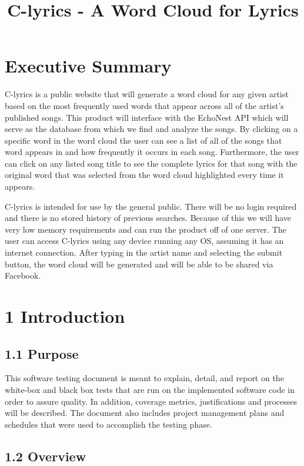 \documentclass[]{article}
\author{}
\date{}
\begin{document}
\title{C-lyrics - A Word Cloud for Lyrics}

\section{\textbf{Executive Summary}}\label{executive-summary}

C-lyrics is a public website that will generate a word cloud for any
given artist based on the most frequently used words that appear across
all of the artist's published songs. This product will interface with
the EchoNest API which will serve as the database from which we find and
analyze the songs. By clicking on a specific word in the word cloud the
user can see a list of all of the songs that word appears in and how
frequently it occurs in each song. Furthermore, the user can click on
any listed song title to see the complete lyrics for that song with the
original word that was selected from the word cloud highlighted every
time it appears.

C-lyrics is intended for use by the general public. There will be no
login required and there is no stored history of previous searches.
Because of this we will have very low memory requirements and can run
the product off of one server. The user can access C-lyrics using any
device running any OS, assuming it has an internet connection. After
typing in the artist name and selecting the submit button, the word
cloud will be generated and will be able to be shared via Facebook.

\pagebreak

\section{\textbf{1 Introduction}}\label{introduction}

\subsection{\textbf{1.1 Purpose }}\label{purpose}

This software testing document is meant to explain, detail, and report
on the white-box and black box tests that are run on the implemented
software code in order to assure quality. In addition, coverage metrics,
justifications and processes will be described. The document also
includes project management plans and schedules that were used to
accomplish the testing phase.

\subsection{\textbf{1.2 Overview }}\label{overview}
\end{document}
